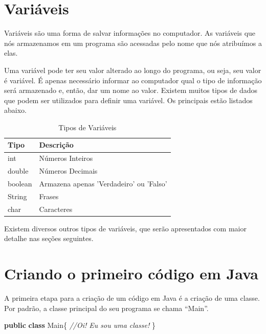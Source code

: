 \documentclass[
]{book}
\newenvironment{Shaded}{\begin{snugshade}}{\end{snugshade}}
\newcommand{\CommentTok}[1]{\textcolor[rgb]{0.56,0.35,0.01}{\textit{#1}}}
\newcommand{\KeywordTok}[1]{\textcolor[rgb]{0.13,0.29,0.53}{\textbf{#1}}}
\newcommand{\NormalTok}[1]{#1}
\begin{document}
\hypertarget{variuxe1veis}{%
\section{Variáveis}\label{variuxe1veis}}

Variáveis são uma forma de salvar informações no computador. As variáveis que nós armazenamos em um programa são acessadas pelo nome que nós atribuímos a elas.

Uma variável pode ter seu valor alterado ao longo do programa, ou seja, seu valor é variável. É apenas necessário informar ao computador qual o tipo de informação será armazenado e, então, dar um nome ao valor. Existem muitos tipos de dados que podem ser utilizados para definir uma variável. Os principais estão listados abaixo.

\begin{table}

\caption{\label{tab:unnamed-chunk-1}Tipos de Variáveis}
\centering
\begin{tabular}[t]{l|l}
\hline
Tipo & Descrição\\
\hline
int & Números Inteiros\\
\hline
double & Números Decimais\\
\hline
boolean & Armazena apenas 'Verdadeiro' ou 'Falso'\\
\hline
String & Frases\\
\hline
char & Caracteres\\
\hline
\end{tabular}
\end{table}

Existem diversos outros tipos de variáveis, que serão apresentados com maior detalhe nas seções seguintes.

\hypertarget{criando-o-primeiro-cuxf3digo-em-java}{%
\section{Criando o primeiro código em Java}\label{criando-o-primeiro-cuxf3digo-em-java}}

A primeira etapa para a criação de um código em Java é a criação de uma classe. Por padrão, a classe principal do seu programa se chama ``Main''.

\begin{Shaded}
\begin{Highlighting}[]
\KeywordTok{public} \KeywordTok{class}\NormalTok{ Main\{}
  \CommentTok{//Oi! Eu sou uma classe!}
\NormalTok{\}}
\end{Highlighting}
\end{Shaded}
\end{document}
